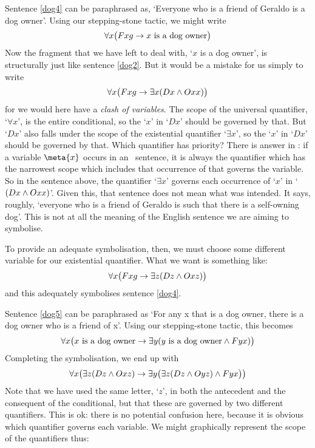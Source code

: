 Sentence \ref{dog4} can be paraphrased as, `Everyone who is a friend of Geraldo is a dog owner'. Using our stepping-stone tactic, we might write 
$$\forall x \bigl(Fxg \rightarrow x \text{ is a dog owner}\bigr)$$
Now the fragment that we have left to deal with, `$x$ is a dog owner', is structurally just like sentence \ref{dog2}. But it would be a mistake for us simply to write 
$$\forall x \bigl(Fxg \rightarrow \exists x(Dx \wedge Oxx) \bigr)$$
for we would here have a \emph{clash of variables}. The scope of the universal quantifier, `$\forall x$', is the entire conditional, so the `$x$' in `$Dx$' should be governed by that. But `$Dx$' also falls under the scope of the existential quantifier `$\exists x$', so the `$x$' in `$Dx$' should be governed by that. Which quantifier has priority? There is answer in \FOL: if a variable $\meta{x}$ occurs in an \FOL\ sentence, it is always the quantifier which has the narrowest scope which includes that occurrence of  that governs the variable. So in the sentence above, the quantifier `$\exists x$' governs each occurrence of `$x$' in `$(Dx \wedge Oxx)$'. Given this, that sentence does not mean what was intended. It says, roughly, `everyone who is a friend of Geraldo is such that there is a self-owning dog'. This is not at all the meaning of the English sentence we are aiming to symbolise.



To provide an adequate symbolisation, then, we must choose some different variable for our existential quantifier. What we want is something like:
$$\forall x\bigl(Fxg \rightarrow\exists z(Dz \wedge Oxz) \bigr)$$
and this adequately symbolises sentence \ref{dog4}.

Sentence \ref{dog5} can be paraphrased as `For any x that is a dog owner, there is a dog owner who is a friend of x'. Using our stepping-stone tactic, this becomes 
$$\forall x\bigl(\mbox{$x$ is a dog owner}\rightarrow\exists y(\mbox{$y$ is a dog owner}\wedge Fyx) \bigr)$$
Completing the symbolisation, we end up with
$$\forall x\bigl(\exists z(Dz \wedge Oxz)\rightarrow\exists y\bigl(\exists z(Dz \wedge Oyz)\wedge Fyx\bigr) \bigr)$$
Note that we have used the same letter, `$z$', in both the antecedent and the consequent of the conditional, but that these are governed by two different quantifiers. This is ok: there is no potential confusion here, because it is obvious which quantifier governs each variable. We might graphically represent the scope of the quantifiers thus:


